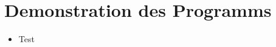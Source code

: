 \section{Demonstration des Programms}
\begin{frame}{\insertsection}
	\begin{itemize}
		\item  Test
	\end{itemize}

	
\end{frame}
